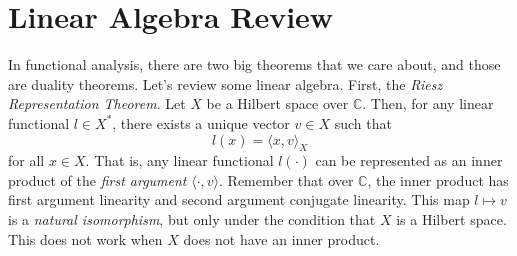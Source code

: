 \section{Linear Algebra Review}

	In functional analysis, there are two big theorems that we care about, and those are duality theorems. Let's review some linear algebra. First, the \textit{Riesz Representation Theorem}. Let $X$ be a Hilbert space over $\mathbb{C}$. Then, for any linear functional $l \in X^*$, there exists a unique vector $v \in X$ such that 
	\begin{equation}
	  l(x) = \langle x, v \rangle_X
	\end{equation}
	for all $x \in X$. That is, any linear functional $l(\cdot)$ can be represented as an inner product of the \textit{first argument} $\langle \cdot , v \rangle$. Remember that over $\mathbb{C}$, the inner product has first argument linearity and second argument conjugate linearity. This map $l \mapsto v$ is a \textit{natural isomorphism}, but only under the condition that $X$ is a Hilbert space. This does not work when $X$ does not have an inner product. 

